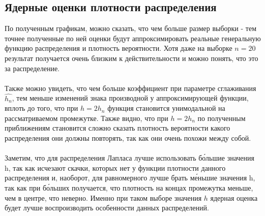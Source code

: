 \subsection{Ядерные оценки плотности распределения}
	По полученным графикам, можно сказать, что чем больше размер выборки - тем точнее полученные по ней оценки будут аппроксимировать реальные генеральную функцию распределения и плотность вероятности. Хотя даже на выборке $n = 20$ результат получается очень близким к действительности и можно понять, что это за распределение.
	\\
	\\
	Также можно увидеть, что чем больше коэффициент при параметре сглаживания $\hat{h_n}$, тем меньше изменений знака производной у аппроксимирующей функции, вплоть до того, что при $h = 2h_n$ функция становится унимодальной на рассматриваемом промежутке. Также видно, что при $h = 2h_n$ по полученным приближениям становится сложно сказать плотность вероятности какого распределения они должны повторять, так как они очень похожи между собой.
	\\
	\\
	Заметим, что для распределения Лапласа лучше использовать б\'{о}льшие значения h, так как исчезают скачки, которых нет у функции плотности данного распределения и, наоборот, для равномерного лучше брать м\'{е}ньшие значения h, так как при б\'{о}льших получается, что плотность на концах промежутка меньше, чем в центре, что неверно. Именно при таком выборе значения $h$ ядерная оценка будет лучше воспроизводить особенности данных распределений.
	
	
	
	
	
	
	